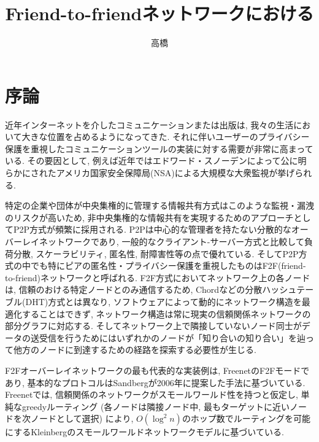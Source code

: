 \documentclass[dvipdfmx]{ampbt}
\title{Friend-to-friendネットワークにおける} %
      {効率的な分散ルーティング}                         %
      {}                                         %
\author{高橋}{彰}             %
\begin{document}
\ifoutputbody
\makeinsidecover                %
\makeabstract                   %
\maketoc                        %
\setcounter{page}{1}            %
\section{序論}
近年インターネットを介したコミュニケーションまたは出版は, 我々の生活において大きな位置を占めるようになってきた. それに伴いユーザーのプライバシー保護を重視したコミュニケーションツールの実装に対する需要が非常に高まっている. その要因として, 例えば近年ではエドワード・スノーデンによって公に明らかにされたアメリカ国家安全保障局(NSA)による大規模な大衆監視が挙げられる.

特定の企業や団体が中央集権的に管理する情報共有方式はこのような監視・漏洩のリスクが高いため, 非中央集権的な情報共有を実現するためのアプローチとしてP2P方式が頻繁に採用される. P2Pは中心的な管理者を持たない分散的なオーバーレイネットワークであり, 一般的なクライアント-サーバー方式と比較して負荷分散, スケーラビリティ, 匿名性, 耐障害性等の点で優れている\cite{lua2005survey}. そしてP2P方式の中でも特にピアの匿名性・プライバシー保護を重視したものはF2F(friend-to-friend)\cite{bricklin2000friend}ネットワークと呼ばれる. F2F方式においてネットワーク上の各ノードは, 信頼のおける特定ノードとのみ通信するため, Chord\cite{stoica2001chord}などの分散ハッシュテーブル(DHT)方式とは異なり, ソフトウェアによって動的にネットワーク構造を最適化することはできず, ネットワーク構造は常に現実の信頼関係ネットワークの部分グラフに対応する. そしてネットワーク上で隣接していないノード同士がデータの送受信を行うためにはいずれかのノードが「知り合いの知り合い」を辿って他方のノードに到達するための経路を探索する必要性が生じる\cite{roos2016dealing}.

F2Fオーバーレイネットワークの最も代表的な実装例は, Freenet\cite{clarke2001freenet}のF2Fモード\cite{clarke2010private}であり, 基本的なプロトコルはSandberg\cite{sandberg2006distributed}が2006年に提案した手法に基づいている. Freenetでは, 信頼関係のネットワークがスモールワールド性を持つと仮定し, 単純なgreedyルーティング (各ノードは隣接ノード中, 最もターゲットに近いノードを次ノードとして選択) により, $O(\log^2 n)$のホップ数でルーティングを可能にするKleinbergのスモールワールドネットワークモデル\cite{kleinberg2000small}に基づいている.
\end{document}
